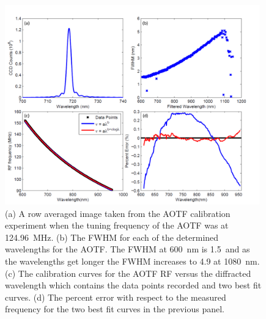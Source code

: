 \documentclass[12pt]{article}
\begin{document}
\begin{figure}
    \begin{subfigure}[t]{0\textwidth}
        \label{fig:3.1:AOTFCharaterization:a}
    \end{subfigure}
    \begin{subfigure}[t]{0\textwidth}
         \label{fig:3.1:AOTFCharaterization:b}
    \end{subfigure}
    \begin{subfigure}[t]{0\textwidth}
         \label{fig:3.1:AOTFCharaterization:c}
    \end{subfigure}
    \begin{subfigure}[t]{0\textwidth}
         \label{fig:3.1:AOTFCharaterization:d}
    \end{subfigure}
    \includegraphics[width=0.98\textwidth]{./Images/3-1-AOTFCharaterization.pdf}
    \caption{(a) A row averaged image taken from the AOTF calibration experiment when the tuning frequency of the AOTF was at 124.96~MHz. (b) The FWHM for each of the determined wavelengths for the AOTF. The FWHM at 600~nm is 1.5~and as the wavelengths get longer the FWHM increases to 4.9 at 1080~nm. (c) The calibration curves for the AOTF RF versus the diffracted wavelength which contains the data points recorded and two best fit curves. (d) The percent error with respect to the measured frequency for the two best fit curves in the previous panel.}
    \label{fig:3.1:AOTFCharaterization}
\end{figure}
\end{document}

